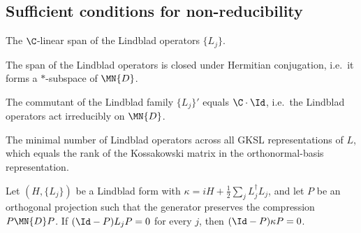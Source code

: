
\subsection{Sufficient conditions for non-reducibility}
\label{sec:cor_7_2_sufficient_conditions}

\begin{definition}\label{def:lindblad_span}
    \leanok
    The $\C$-linear span of the Lindblad operators $\{L_j\}$.
\end{definition}

\begin{definition}\label{def:is_lindblad_span_hermitian_closed}
    \leanok
    The span of the Lindblad operators is closed under Hermitian conjugation,
    i.e.\ it forms a $*$-subspace of $\MN{D}$.
\end{definition}

\begin{definition}\label{def:has_lindblad_span_trivial_commutant}
    \leanok
    The commutant of the Lindblad family $\{L_j\}'$ equals $\C\cdot\Id$,
    i.e.\ the Lindblad operators act irreducibly on $\MN{D}$.
\end{definition}

\begin{definition}\label{def:kossakowski_rank}
    \leanok
    The minimal number of Lindblad operators across all GKSL representations
    of $L$, which equals the rank of the Kossakowski matrix in the
    orthonormal-basis representation.
\end{definition}

\begin{theorem}%
    \label{thm:kappa_block_generator_compression}
    \leanok
    Let $(H,\{L_j\})$ be a Lindblad form with
    $\kappa=iH+\tfrac{1}{2}\sum_jL_j^\dagger L_j$, and let $P$ be an
    orthogonal projection such that the generator preserves the compression
    $P\MN{D}P$.
    If $(\Id-P)L_jP=0$ for every $j$, then $(\Id-P)\kappa P=0$.
\end{theorem}


